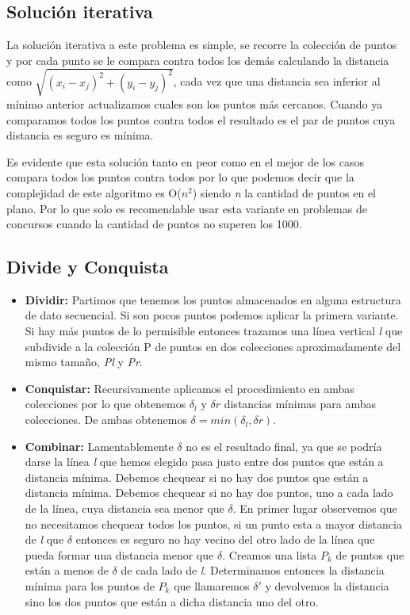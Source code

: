 
\subsection{Solución iterativa}

La solución iterativa a este problema es simple, se recorre la colección de puntos y por cada punto se le compara contra todos los demás calculando la distancia como $ \sqrt{ (x_{i}-x_{j})^{2} +(y_{i}-y_{j})^{2}} $, cada vez que una distancia sea inferior al mínimo anterior actualizamos cuales son los puntos más cercanos. Cuando ya comparamos todos los puntos contra todos el resultado es el par de puntos cuya distancia es seguro es mínima.

Es evidente que esta solución tanto en peor como en el mejor de los casos compara todos los puntos contra todos por lo que podemos decir que la complejidad de este algoritmo es O($n^{2}$) siendo {\em n} la cantidad de puntos en el plano. Por lo que solo es recomendable usar esta variante en problemas de concursos cuando la cantidad de puntos no superen los 1000.

\subsection{Divide y Conquista}

\begin{itemize}
	\item {\bf Dividir:} Partimos que tenemos los puntos almacenados en alguna estructura de dato secuencial. Si son pocos puntos podemos aplicar la primera variante. Si hay más puntos de lo permisible entonces trazamos una línea vertical {\em l} que subdivide a la colección P de puntos en dos colecciones aproximadamente del mismo tamaño, {\em Pl} y {\em Pr}. 
	\item {\bf Conquistar:} Recursivamente aplicamos el procedimiento en ambas colecciones por lo que obtenemos $\delta_{l}$ y $\delta{r}$ distancias mínimas
	para ambas colecciones. De ambas obtenemos $\delta=min(\delta_{l}, \delta{r})$.
	\item {\bf Combinar:} Lamentablemente $\delta$ no es el resultado final, ya que se podría darse la línea {\em l} que hemos elegido pasa justo entre dos puntos que están a distancia mínima. Debemos chequear si no hay dos puntos que están a distancia mínima. Debemos chequear si no hay dos puntos, uno a cada lado de la línea, cuya distancia sea menor que $ \delta $. En primer lugar observemos que no necesitamos chequear todos los puntos, si un punto esta a mayor distancia de {\em l} que $\delta$ entonces es seguro no hay vecino del otro lado de la línea que pueda formar una distancia menor que $\delta$. Creamos una lista  $P_{k}$ de puntos que están a menos de $\delta$ de cada lado de {\em l}. Determinamos entonces la distancia mínima para los puntos de $P_{k}$ que llamaremos $\delta'$ y devolvemos la distancia sino los dos puntos que están a dicha distancia uno del otro. 
\end{itemize}

